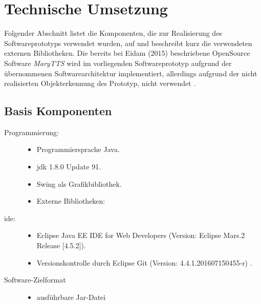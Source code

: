 \section{Technische Umsetzung}
\label{section:techkomp}
Folgender Abschnitt listet die Komponenten, die zur Realisierung des Softwareprototyps verwendet wurden, auf und beschreibt kurz die verwendeten externen Bibliotheken. Die bereits bei Eidam (2015) beschriebene OpenSource Software \textit{MaryTTS} wird im vorliegenden Softwareprototyp aufgrund der übernommenen Softwarearchitektur implementiert, allerdings aufgrund der nicht realisierten Objekterkennung des Prototyp, nicht verwendet \cite{Eidam2015}. 
\subsection{Basis Komponenten}
\begin{description}
\item[Programmierung:] \hfill
\begin{itemize}
\item Programmiersprache Java.
\item \acf{jdk} 1.8.0 Update 91.
\item Swing als Grafikbibliothek.
\item Externe Bibliotheken: \hfill
{}  
\end{itemize}
\item[\acf{ide}:] \hfill
\begin{itemize}
\item Eclipse Java EE IDE for Web Developers (Version: Eclipse Mars.2 Release [4.5.2]).
\item Versionskontrolle durch Eclipse Git (Version: 4.4.1.201607150455-r) .
\end{itemize}
\item[Software-Zielformat]\hfill
\begin{itemize}
\item ausführbare Jar-Datei
\end{itemize}
\end{description}
